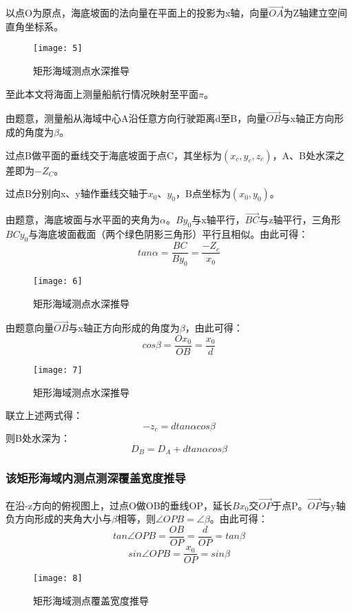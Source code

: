 \documentclass[withoutpreface,bwprint]{cumcmthesis} %
\begin{document}
以点O为原点，海底坡面的法向量在平面上的投影为x轴，向量$\vec{OA}$为Z轴建立空间直角坐标系。
\begin{figure}[H]
    \centering
    \texttt{[image: 5]}
    \caption{矩形海域测点水深推导}
    \label{fig:four}
\end{figure}

至此本文将海面上测量船航行情况映射至平面$\pi$。

由题意，测量船从海域中心A沿任意方向行驶距离d至B，向量$\vec{OB}$与x轴正方向形成的角度为$\beta$。

过点B做平面的垂线交于海底坡面于点C，其坐标为$(x_c,y_c,z_c)$，A、B处水深之差即为$-Z_C$。

过点B分别向x、y轴作垂线交轴于$x_0$、$y_0$，B点坐标为$(x_0,y_0)$。

由题意，海底坡面与水平面的夹角为$\alpha$。$By_0$与x轴平行，$\vec{BC}$与z轴平行，三角形$BCy_0$与海底坡面截面（两个绿色阴影三角形）平行且相似。由此可得：
\begin{equation}
tan\alpha=\frac{BC}{By_0}=\frac{-Z_c}{x_0}
\end{equation}
\begin{figure}[H]
    \centering
    \texttt{[image: 6]}
    \caption{矩形海域测点水深推导}
    \label{fig:four}
\end{figure}

由题意向量$\vec{OB}$与x轴正方向形成的角度为$\beta$，由此可得：
\begin{equation}
cos\beta=\frac{Ox_0}{OB}=\frac{x_0}{d}
\end{equation}
\begin{figure}[H]
    \centering
    \texttt{[image: 7]}
    \caption{矩形海域测点水深推导}
    \label{fig:four}
\end{figure}

联立上述两式得：
\begin{equation}
-z_c=d tan\alpha cos\beta
\end{equation}
则B处水深为：
\begin{equation}
D_B=D_A+dtan\alpha cos\beta
\end{equation}
\subsubsection{该矩形海域内测点测深覆盖宽度推导}
在沿-z方向的俯视图上，过点O做OB的垂线OP，延长$Bx_0$交$\vec{OP}$于点P。$\vec{OP}$与y轴负方向形成的夹角大小与$\beta$相等，则$\angle OPB=\angle \beta$。由此可得：
\begin{equation}
tan\angle OPB=\frac{OB}{OP}=\frac{d}{OP}=tan\beta
\end{equation}
\begin{equation}
sin\angle OPB=\frac{x_0}{OP}=sin\beta
\end{equation}
\begin{figure}[H]
    \centering
    \texttt{[image: 8]}
    \caption{矩形海域测点覆盖宽度推导}
    \label{fig:four}
\end{figure}
\end{document}
